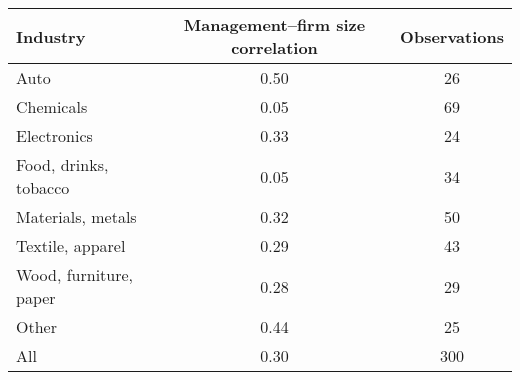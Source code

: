     \begin{tabular}{l c c} 
        \toprule
        Industry & Management--firm size correlation &  Observations \\ 
        \midrule
        Auto & 0.50 &  26 \\
        Chemicals & 0.05 &  69 \\
        Electronics & 0.33  & 24 \\
        Food, drinks, tobacco & 0.05  & 34 \\
        Materials, metals & 0.32 & 50 \\
        Textile, apparel & 0.29 & 43 \\
        Wood, furniture, paper & 0.28  & 29 \\
        Other & 0.44 & 25 \\
        \midrule
        All & 0.30 & 300 \\
        \bottomrule
    \end{tabular}
